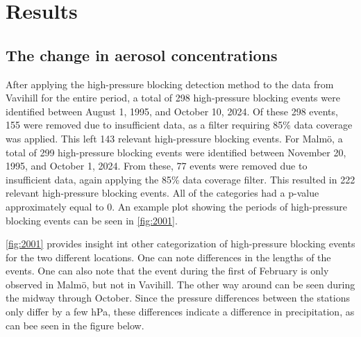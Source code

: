 \newpage
\section{Results}
\subsection{The change in aerosol concentrations}
After applying the high-pressure blocking detection method to the data from Vavihill for the entire period, a total of 298 high-pressure blocking events were identified between August 1, 1995, and October 10, 2024. Of these 298 events, 155 were removed due to insufficient \PM  data, as a filter requiring 85\% data coverage was applied. This left 143 relevant high-pressure blocking events. For Malmö, a total of 299 high-pressure blocking events were identified between November 20, 1995, and October 1, 2024. From these, 77 events were removed due to insufficient \PM  data, again applying the 85\% data coverage filter. This resulted in 222 relevant high-pressure blocking events. All of the categories had a p-value approximately equal to 0. An example plot showing the periods of high-pressure blocking events can be seen in \autoref{fig:2001}.


\autoref{fig:2001} provides insight int other categorization of high-pressure blocking events for the two different locations. One can note differences in the lengths of the events. One can also note that the event during the first of February is only observed in Malmö, but not in Vavihill. The other way around can be seen during the midway through October. Since the pressure differences between the stations only differ by a few hPa, these differences indicate a difference in precipitation, as can bee seen in the figure below. 

